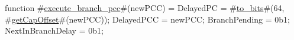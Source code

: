 function #\hyperref[sailMIPSzexecutezybranchzypcc]{execute\_branch\_pcc}#(newPCC) = {
  DelayedPC = #\hyperref[sailMIPSztozybits]{to\_bits}#(64, #\hyperref[sailMIPSzgetCapOffset]{getCapOffset}#(newPCC));
  DelayedPCC = newPCC;
  BranchPending = 0b1;
  NextInBranchDelay = 0b1;
}

